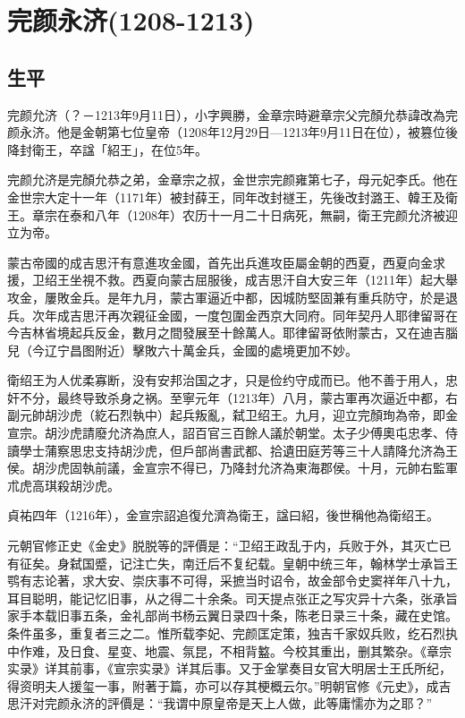 
\section{完颜永济\tiny(1208-1213)}

\subsection{生平}

完颜允济（？－1213年9月11日），小字興勝，金章宗時避章宗父完顏允恭諱改為完颜永济。他是金朝第七位皇帝（1208年12月29日—1213年9月11日在位），被篡位後降封衛王，卒諡「紹王」，在位5年。

完颜允济是完顏允恭之弟，金章宗之叔，金世宗完颜雍第七子，母元妃李氏。他在金世宗大定十一年（1171年）被封薛王，同年改封禭王，先後改封潞王、韓王及衛王。章宗在泰和八年（1208年）农历十一月二十日病死，無嗣，衛王完颜允济被迎立为帝。

蒙古帝國的成吉思汗有意進攻金國，首先出兵進攻臣屬金朝的西夏，西夏向金求援，卫绍王坐視不救。西夏向蒙古屈服後，成吉思汗自大安三年（1211年）起大舉攻金，屢敗金兵。是年九月，蒙古軍逼近中都，因城防堅固兼有重兵防守，於是退兵。次年成吉思汗再次親征金國，一度包圍金西京大同府。同年契丹人耶律留哥在今吉林省境起兵反金，數月之間發展至十餘萬人。耶律留哥依附蒙古，又在迪吉腦兒（今辽宁昌图附近）擊敗六十萬金兵，金國的處境更加不妙。

衛绍王为人优柔寡断，没有安邦治国之才，只是俭约守成而已。他不善于用人，忠奸不分，最终导致杀身之祸。至寧元年（1213年）八月，蒙古軍再次逼近中都，右副元帥胡沙虎（紇石烈執中）起兵叛亂，弑卫绍王。九月，迎立完顏珣為帝，即金宣宗。胡沙虎請廢允济為庶人，詔百官三百餘人議於朝堂。太子少傅奧屯忠孝、侍讀學士蒲察思忠支持胡沙虎，但戶部尚書武都、拾遺田庭芳等三十人請降允济為王侯。胡沙虎固執前議，金宣宗不得已，乃降封允济為東海郡侯。十月，元帥右監軍朮虎高琪殺胡沙虎。

貞祐四年（1216年），金宣宗詔追復允濟為衛王，諡曰紹，後世稱他為衛绍王。

元朝官修正史《金史》脱脱等的評價是：“卫绍王政乱于内，兵败于外，其灭亡已有征矣。身弑国蹙，记注亡失，南迁后不复纪载。皇朝中统三年，翰林学士承旨王鹗有志论著，求大安、崇庆事不可得，采摭当时诏令，故金部令史窦祥年八十九，耳目聪明，能记忆旧事，从之得二十余条。司天提点张正之写灾异十六条，张承旨家手本载旧事五条，金礼部尚书杨云翼日录四十条，陈老日录三十条，藏在史馆。条件虽多，重复者三之二。惟所载李妃、完颜匡定策，独吉千家奴兵败，纥石烈执中作难，及日食、星变、地震、氛昆，不相背盭。今校其重出，删其繁杂。《章宗实录》详其前事，《宣宗实录》详其后事。又于金掌奏目女官大明居士王氏所纪，得资明夫人援玺一事，附著于篇，亦可以存其梗概云尔。”明朝官修《元史》，成吉思汗对完颜永济的評價是：“我谓中原皇帝是天上人做，此等庸懦亦为之耶？”

